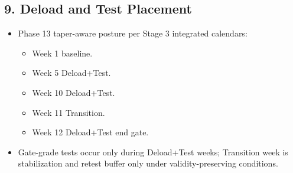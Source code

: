 \documentclass[10pt]{article}
\begin{document}
\subsection*{9. Deload and Test Placement}

\begin{itemize}
\item Phase 13 taper-aware posture per Stage 3 integrated calendars:
  \begin{itemize}
  \item Week 1 baseline.
  \item Week 5 Deload+Test.
  \item Week 10 Deload+Test.
  \item Week 11 Transition.
  \item Week 12 Deload+Test end gate.
  \end{itemize}
\item Gate-grade tests occur only during Deload+Test weeks; Transition week is stabilization and retest buffer only under validity-preserving conditions.
\end{itemize}
\end{document}
